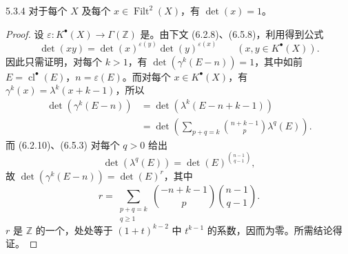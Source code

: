 \begin{SGAresult}{}{5.3.4}
对于每个 $X$ 及每个 $x\in\operatorname{Filt}^2(X)$，有 $\det(x)=1$。
\end{SGAresult}
\begin{proof}
设 $\varepsilon:K^\bullet(X)\longrightarrow\Gamma(\mathbb Z)$ 是。由下文 (6.2.8)、(6.5.8)，利用得到公式
\[\det(xy)=\det(x)^{\varepsilon(y)}\det(y)^{\varepsilon(x)}\qquad(x,y\in K^\bullet(X)).\tag{5.3.5}\]
因此只需证明，对每个 $k>1$，有 $\det(\gamma^k(E-n))=1$，其中如前 $E=\operatorname{cl}^\bullet(E)$，$n=\varepsilon(E)$。而对每个 $x\in K^\bullet(X)$，有 $\gamma^k(x)=\lambda^k(x+k-1)$，所以
\[\begin{aligned}
\det(\gamma^k(E-n))&=\det(\lambda^k(E-n+k-1))\\
&=\det\left(\sum_{p+q=k}\binom{n+k-1}{p}\lambda^q(E)\right).
\end{aligned}\]
而 (6.2.10)、(6.5.3) 对每个 $q>0$ 给出
\[\det(\lambda^q(E))=\det(E)^{\binom{n-1}{q-1}},\]
故 $\det(\gamma^k(E-n))=\det(E)^r$，其中
\[r=\sum_{\substack{p+q=k\\q\geq1}}\binom{-n+k-1}{p}\binom{n-1}{q-1}.\]
$r$ 是 $\mathbb Z$ 的一个，处处等于 $(1+t)^{k-2}$ 中 $t^{k-1}$ 的系数，因而为零。所需结论得证。
\end{proof}
